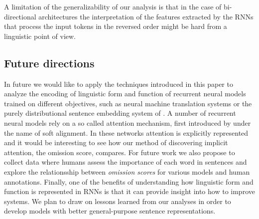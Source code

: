 
A limitation of the generalizability of our 
analysis is that in the case of 
bi-directional architectures the interpretation of the features
extracted by the RNNs that process the input tokens in the reversed order
might be hard from a linguistic point of view. 

\subsection{Future directions}

In future we would like to apply the techniques introduced in this paper 
to analyze the encoding of linguistic form and function of 
recurrent neural models trained on different objectives, 
such as neural machine translation systems
\cite{sutskever2014sequence} or the purely distributional
sentence embedding system of \cite{kiros2015skip}. A number of
recurrent neural models rely on a so called attention mechanism, first
introduced by  under the name of soft
alignment. In these networks attention is explicitly represented and it
would be interesting to see how our method of discovering implicit
attention, the omission score, compares. For future work we also propose to
collect data where humans assess the importance of each word in sentences
and explore the relationsship between \emph{omission scores} for various models
and human annotations.\label{edit:humanjudgement} Finally, one of the benefits
of understanding how linguistic form and function is represented in RNNs is that
it can provide insight into how to improve systems. We plan to draw on
lessons learned from our analyses in order to develop models with better 
general-purpose sentence representations.





